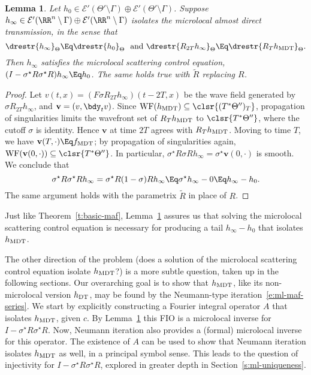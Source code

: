 \documentclass[10pt]{article}
\theoremstyle{plain}
\newtheorem{lemma}[theorem]{Lemma}
\theoremstyle{definition}
\theoremstyle{remark}
\numberwithin{theorem}{section}
\numberwithin{example}{section}
\numberwithin{equation}{section}
\numberwithin{figure}{section}
\let\d\bdy 						%
\DeclareMathOperator\WF{WF}		%
\newcommand\DT{\ensuremath{_{\text{\normalfont DT}}}}		%
\newcommand\MDT{\ensuremath{_{\text{\normalfont MDT}}}}	%
\newcommand\eqml{\Eq}					%
\begin{document}
\begin{lemma}
	Let $h_0\in \mathcal E'(\Theta'\setminus\Gamma)\oplus \mathcal E'(\Theta'\setminus\Gamma)$. Suppose $h_\infty\in \mathcal E'(\RR^n\setminus\Gamma)\oplus \mathcal E'(\RR^n\setminus\Gamma)$ isolates the microlocal almost direct transmission, in the sense that
	\begin{equation}
	 	\drestr{h_\infty}_{\Theta}\eqml \drestr{h_0}_{\Theta} \text{\ \ and } \drestr{R_{2T}h_\infty}_{\Theta}\eqml\drestr{R_Th\MDT}_{\Theta}.
	\end{equation}
	Then $h_\infty$ satisfies the microlocal scattering control equation, $(I-\sigma^\star R\sigma^\star R)h_\infty \eqml h_0$. The same holds true with $\tilde R$ replacing $R$.
	
	\label{l:isolate-mdt}
\end{lemma}

\begin{proof}
	Let $v(t,x)=(F\sigma R_{2T}h_\infty)(t-2T,x)$ be the wave field generated by $\sigma R_{2T}h_\infty$, and $\mathbf v=(v,\d_t v)$. Since $\WF(h\MDT)\subseteq \clsr{(T^*\Theta'')_T}$, propagation of singularities limits the wavefront set of $R_Th\MDT$ to $\clsr{T^*\Theta''}$, where the cutoff $\sigma$ is identity. Hence $\mathbf v$ at time $2T$ agrees with $R_Th\MDT$. Moving to time $T$, we have $\mathbf v(T,\cdot)\eqml f\MDT$; by propagation of singularities again, $\WF(\mathbf v(0,\cdot))\subseteq \clsr{T^*\Theta''}$. In particular, $\sigma^\star R\sigma Rh_\infty = \sigma^\star \mathbf v(0,\cdot)$ is smooth. We conclude that
	\begin{equation}
		\sigma^\star R\sigma^\star R h_\infty = \sigma^\star R(1 - \sigma) Rh_\infty \eqml \sigma^\star h_\infty - 0 \eqml h_\infty - h_0.
	\end{equation}
	The same argument holds with the parametrix $\tilde R$ in place of $R$.
\end{proof}

Just like Theorem~\ref{t:basic-maf}, Lemma~\ref{l:isolate-mdt} assures us that solving the microlocal scattering control equation is necessary for producing a tail $h_\infty-h_0$ that isolates $h\MDT$.

The other direction of the problem (does a solution of the microlocal scattering control equation isolate $h\MDT$?) is a more subtle question, taken up in the following sections. Our overarching goal is to show that $h\MDT$, like its non-microlocal version $h\DT$, may be found by the Neumann-type iteration~\eqref{e:ml-maf-series}.
We start by explicitly constructing a Fourier integral operator $A$ that isolates $h\MDT$, given $c$. By Lemma~\ref{l:isolate-mdt} this FIO is a microlocal inverse for $I-\sigma^\star R\sigma^\star R$. Now, Neumann iteration also provides a (formal) microlocal inverse for this operator. The existence of $A$ can be used to show that Neumann iteration isolates $h\MDT$ as well, in a principal symbol sense. This leads to the question of injectivity for $I-\sigma^\star R\sigma^\star R$, explored in greater depth in Section~\ref{s:ml-uniqueness}.
\end{document}
